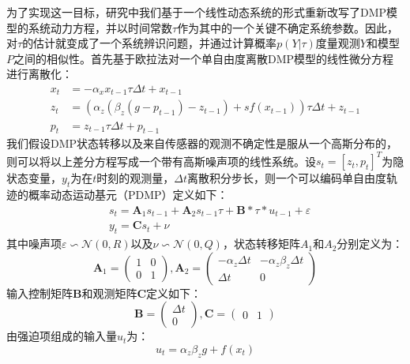 为了实现这一目标，研究中我们基于一个线性动态系统的形式重新改写了DMP模型的系统动力方程，并以时间常数$τ$作为其中的一个关键不确定系统参数。因此，对$τ$的估计就变成了一个系统辨识问题，并通过计算概率$p(Y|τ)$度量观测$Y$和模型$P$之间的相似性。首先基于欧拉法对一个单自由度离散DMP模型的线性微分方程进行离散化：
\begin{equation}
    \begin{aligned}
    x_t & =-\alpha_x x_{t-1} \tau \Delta t+x_{t-1} \\
    z_t & =\left(\alpha_z\left(\beta_z\left(g-p_{t-1}\right)-z_{t-1}\right)+s f\left(x_{t-1}\right)\right) \tau \Delta t+z_{t-1} \\
    p_t & =z_{t-1} \tau \Delta t+p_{t-1}
    \end{aligned}
    \label{eq:4-11}
\end{equation}
我们假设DMP状态转移以及来自传感器的观测不确定性是服从一个高斯分布的，则可以将以上差分方程写成一个带有高斯噪声项的线性系统。设$s_t = [z_t,p_t]^T$为隐状态变量，$y_t$为在$t$时刻的观测量，$\Delta t$离散积分步长，则一个可以编码单自由度轨迹的概率动态运动基元（PDMP）定义如下：
\begin{equation}
    \begin{aligned}
    & s_t=\mathbf{A}_1 s_{t-1}+\mathbf{A}_2 s_{t-1} \tau+\mathbf{B} * \tau * u_{t-1}+\varepsilon \\
    & y_t=\mathbf{C} s_t+\nu
    \end{aligned}
    \label{eq:4-12}
\end{equation}
其中噪声项$\varepsilon \backsim \mathcal N(0,R)$以及$\nu \backsim \mathcal N(0,Q)$，状态转移矩阵$A_1$和$A_2$分别定义为：
\begin{equation}
    \mathbf{A}_1=\left(\begin{array}{ll}
    1 & 0 \\
    0 & 1
    \end{array}\right), \mathbf{A}_2=\left(\begin{array}{cc}
    -\alpha_z \Delta t & -\alpha_z \beta_z \Delta t \\
    \Delta t & 0
    \end{array}\right)
    \label{eq:4-13}
\end{equation}
输入控制矩阵$\mathbf{B}$和观测矩阵$\mathbf{C}$定义如下：
\begin{equation}
    \mathbf{B}=\left(\begin{array}{c}
    \Delta t \\
    0
    \end{array}\right), \mathbf{C}=\left(\begin{array}{ll}
    0 & 1
    \end{array}\right)
    \label{eq:4-14}
\end{equation}
由强迫项组成的输入量$u_t$为：
\begin{equation}
    u_t=\alpha_z \beta_z g+ f\left(x_t\right)
    \label{eq:4-15}
\end{equation}

